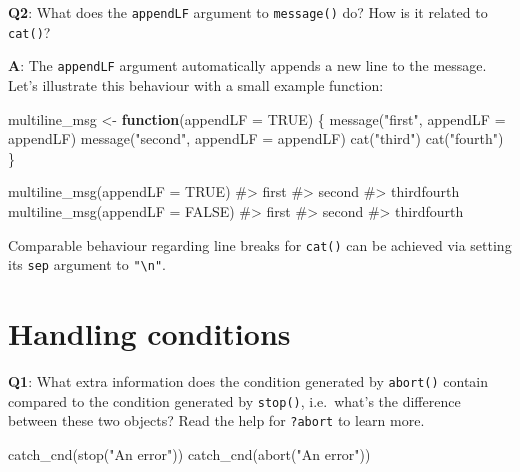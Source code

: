 \documentclass[
]{krantz}
\makeatletter
\newenvironment{Shaded}{\begin{snugshade}}{\end{snugshade}}
\newcommand{\CommentTok}[1]{\textcolor[rgb]{0.56,0.35,0.01}{\textit{#1}}}
\newcommand{\ControlFlowTok}[1]{\textcolor[rgb]{0.13,0.29,0.53}{\textbf{#1}}}
\newcommand{\DataTypeTok}[1]{\textcolor[rgb]{0.13,0.29,0.53}{#1}}
\newcommand{\KeywordTok}[1]{\textcolor[rgb]{0.13,0.29,0.53}{\textbf{#1}}}
\newcommand{\NormalTok}[1]{#1}
\newcommand{\OtherTok}[1]{\textcolor[rgb]{0.56,0.35,0.01}{#1}}
\newcommand{\StringTok}[1]{\textcolor[rgb]{0.31,0.60,0.02}{#1}}
\newenvironment{kframe}{%
\medskip{}
\setlength{\fboxsep}{.8em}
 \def\at@end@of@kframe{}%
 \ifinner\ifhmode%
  \def\at@end@of@kframe{\end{minipage}}%
  \begin{minipage}{\columnwidth}%
 \fi\fi%
 \def\FrameCommand##1{\hskip\@totalleftmargin \hskip-\fboxsep
 \colorbox{shadecolor}{##1}\hskip-\fboxsep
     \hskip-\linewidth \hskip-\@totalleftmargin \hskip\columnwidth}%
 \MakeFramed {\advance\hsize-\width
   \@totalleftmargin\z@ \linewidth\hsize
   \@setminipage}}%
 {\par\unskip\endMakeFramed%
 \at@end@of@kframe}
\renewenvironment{Shaded}{\begin{kframe}}{\end{kframe}}
\renewcommand{\KeywordTok} [1]{\textcolor[rgb]{0.00,0.44,0.13}{{#1}}}
\renewcommand{\DataTypeTok}[1]{\textcolor[rgb]{0.56,0.13,0.00}{{#1}}}
\renewcommand{\StringTok}  [1]{\textcolor[rgb]{0.25,0.44,0.63}{{#1}}}
\renewcommand{\CommentTok} [1]{\textcolor[rgb]{0.38,0.63,0.69}{{#1}}}
\renewcommand{\OtherTok}   [1]{\textcolor[rgb]{0.00,0.44,0.13}{{#1}}}
\renewcommand{\NormalTok}  [1]{{#1}}
\makeatother
\begin{document}
\textbf{{Q2}}: What does the \texttt{appendLF} argument to \texttt{message()} do? How is it related to \texttt{cat()}?

\textbf{{A}}: The \texttt{appendLF} argument automatically appends a new line to the message. Let's illustrate this behaviour with a small example function:

\begin{Shaded}
\begin{Highlighting}[]
\NormalTok{multiline_msg <-}\StringTok{ }\ControlFlowTok{function}\NormalTok{(}\DataTypeTok{appendLF =} \OtherTok{TRUE}\NormalTok{) \{}
  \KeywordTok{message}\NormalTok{(}\StringTok{"first"}\NormalTok{, }\DataTypeTok{appendLF =}\NormalTok{ appendLF)}
  \KeywordTok{message}\NormalTok{(}\StringTok{"second"}\NormalTok{, }\DataTypeTok{appendLF =}\NormalTok{ appendLF)}
  \KeywordTok{cat}\NormalTok{(}\StringTok{"third"}\NormalTok{)}
  \KeywordTok{cat}\NormalTok{(}\StringTok{"fourth"}\NormalTok{)}
\NormalTok{\}}

\KeywordTok{multiline_msg}\NormalTok{(}\DataTypeTok{appendLF =} \OtherTok{TRUE}\NormalTok{)}
\CommentTok{#> first}
\CommentTok{#> second}
\CommentTok{#> thirdfourth}
\KeywordTok{multiline_msg}\NormalTok{(}\DataTypeTok{appendLF =} \OtherTok{FALSE}\NormalTok{)}
\CommentTok{#> first}
\CommentTok{#> second}
\CommentTok{#> thirdfourth}
\end{Highlighting}
\end{Shaded}

Comparable behaviour regarding line breaks for \texttt{cat()} can be achieved via setting its \texttt{sep} argument to \texttt{"\textbackslash{}n"}.


\hypertarget{handling-conditions}{%
\section{Handling conditions}\label{handling-conditions}}

\textbf{{Q1}}: What extra information does the condition generated by \texttt{abort()} contain compared to the condition generated by \texttt{stop()}, i.e.~what's the difference between these two objects? Read the help for \texttt{?abort} to learn more.

\begin{Shaded}
\begin{Highlighting}[]
\KeywordTok{catch_cnd}\NormalTok{(}\KeywordTok{stop}\NormalTok{(}\StringTok{"An error"}\NormalTok{))}
\KeywordTok{catch_cnd}\NormalTok{(}\KeywordTok{abort}\NormalTok{(}\StringTok{"An error"}\NormalTok{))}
\end{Highlighting}
\end{Shaded}
\end{document}
